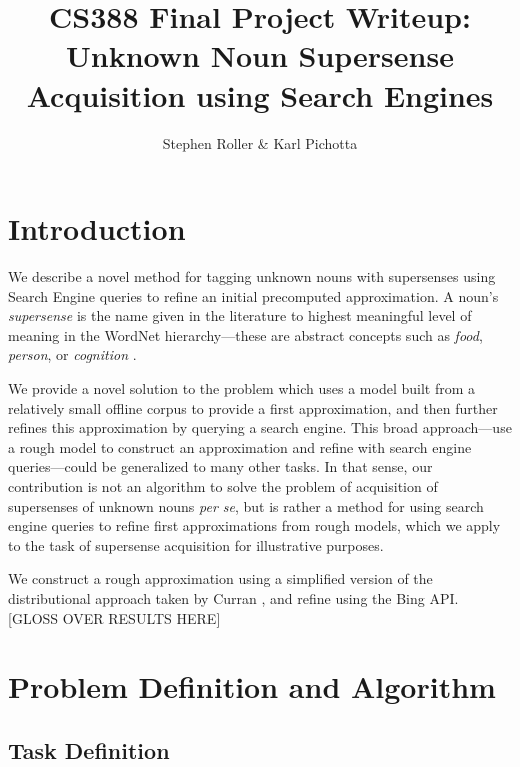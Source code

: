 \documentclass{article}
\title{CS388 Final Project Writeup:\\ 
Unknown Noun Supersense Acquisition using Search Engines}
\author{Stephen Roller \& Karl Pichotta}
\begin{document}
\maketitle




\section{Introduction}


We describe a novel method for tagging unknown nouns with supersenses using Search Engine queries to refine an initial precomputed approximation.
A noun's {\em supersense} is the name given in the literature to highest meaningful level of meaning in the WordNet \cite{wordnet} hierarchy---these are abstract concepts such as {\it food}, {\it person}, or {\it cognition} \cite{cj}.

We provide a novel solution to the problem which uses a model built from a relatively small offline corpus to provide a first approximation, and then further refines this approximation by querying a search engine.
This broad approach---use a rough model to construct an approximation and refine with search engine queries---could be generalized to many other tasks.
In that sense, our contribution is not an algorithm to solve the problem of acquisition of supersenses of unknown nouns {\it per se}, but is rather a method for using search engine queries to refine first approximations from rough models, which we apply to the task of supersense acquisition for illustrative purposes.

We construct a rough approximation using a simplified version of the distributional approach taken by Curran \cite{curran}, and refine using the Bing API.
[GLOSS OVER RESULTS HERE]



\section{Problem Definition and Algorithm}

\subsection{Task Definition}
\end{document}
